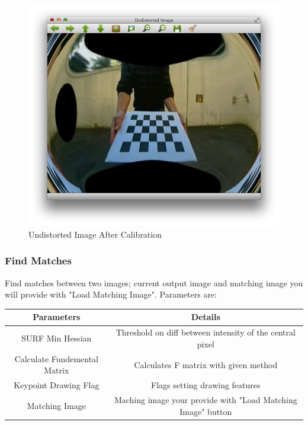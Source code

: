 \documentclass{article}
\begin{document}
\begin{figure}[H]
\begin{center}
\includegraphics[scale=0.3]{toolboxCameraCalibration.png}
\caption{Undistorted Image After Calibration}
\end{center}
\end{figure}	   

\subsubsection{Find Matches}
Find matches between two images; current output image and matching image you will provide with "Load Matching Image". Parameters are:

\begin{table}[H]
\begin{center}
\begin{tabular}{|c|c|l|l|l|}
\hline
\textbf{Parameters}          & \multicolumn{4}{|c|}{\textbf{Details}}                                             \\ \hline
SURF Min Hessian             & \multicolumn{4}{|c|}{Threshold on diff between intensity of the central pixel}  \\ \hline
Calculate Fundemental Matrix & \multicolumn{4}{|c|}{Calculates F matrix with given method}    \\ \hline
Keypoint Drawing Flag        & \multicolumn{4}{|c|}{Flags setting drawing features}                               \\ \hline
Matching Image               & \multicolumn{4}{|c|}{Maching image your provide with "Load Matching Image" button} \\ \hline
\end{tabular}
\end{center}
\end{table}
\end{document}
